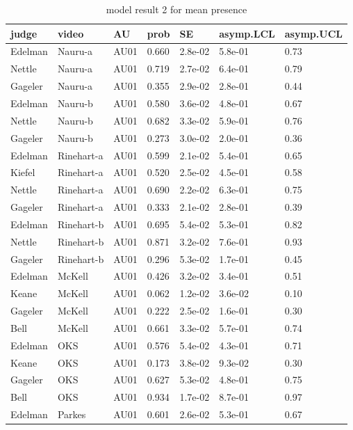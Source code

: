 \documentclass{monashthesis}
\begin{document}
\begin{center}
\begin{longtable}{lllllll}
\caption{model result 2 for mean presence}\\
\toprule
judge & video & AU & prob & SE & asymp.LCL & asymp.UCL \\
\midrule
\endhead
\bottomrule
\endfoot
Edelman & Nauru-a & AU01 & 0.660 & 2.8e-02 & 5.8e-01 & 0.73 \\
Nettle & Nauru-a & AU01 & 0.719 & 2.7e-02 & 6.4e-01 & 0.79 \\
Gageler & Nauru-a & AU01 & 0.355 & 2.9e-02 & 2.8e-01 & 0.44 \\
Edelman & Nauru-b & AU01 & 0.580 & 3.6e-02 & 4.8e-01 & 0.67 \\
Nettle & Nauru-b & AU01 & 0.682 & 3.3e-02 & 5.9e-01 & 0.76 \\
Gageler & Nauru-b & AU01 & 0.273 & 3.0e-02 & 2.0e-01 & 0.36 \\
Edelman & Rinehart-a & AU01 & 0.599 & 2.1e-02 & 5.4e-01 & 0.65 \\
Kiefel & Rinehart-a & AU01 & 0.520 & 2.5e-02 & 4.5e-01 & 0.58 \\
Nettle & Rinehart-a & AU01 & 0.690 & 2.2e-02 & 6.3e-01 & 0.75 \\
Gageler & Rinehart-a & AU01 & 0.333 & 2.1e-02 & 2.8e-01 & 0.39 \\
Edelman & Rinehart-b & AU01 & 0.695 & 5.4e-02 & 5.3e-01 & 0.82 \\
Nettle & Rinehart-b & AU01 & 0.871 & 3.2e-02 & 7.6e-01 & 0.93 \\
Gageler & Rinehart-b & AU01 & 0.296 & 5.3e-02 & 1.7e-01 & 0.45 \\
Edelman & McKell & AU01 & 0.426 & 3.2e-02 & 3.4e-01 & 0.51 \\
Keane & McKell & AU01 & 0.062 & 1.2e-02 & 3.6e-02 & 0.10 \\
Gageler & McKell & AU01 & 0.222 & 2.5e-02 & 1.6e-01 & 0.30 \\
Bell & McKell & AU01 & 0.661 & 3.3e-02 & 5.7e-01 & 0.74 \\
Edelman & OKS & AU01 & 0.576 & 5.4e-02 & 4.3e-01 & 0.71 \\
Keane & OKS & AU01 & 0.173 & 3.8e-02 & 9.3e-02 & 0.30 \\
Gageler & OKS & AU01 & 0.627 & 5.3e-02 & 4.8e-01 & 0.75 \\
Bell & OKS & AU01 & 0.934 & 1.7e-02 & 8.7e-01 & 0.97 \\
Edelman & Parkes & AU01 & 0.601 & 2.6e-02 & 5.3e-01 & 0.67 \\

\end{longtable}
\end{center}
\end{document}
